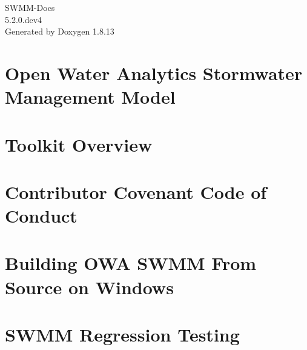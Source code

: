 \documentclass[twoside]{book}
\newcommand{\+}{\discretionary{\mbox{\scriptsize$\hookleftarrow$}}{}{}}
\newcommand{\clearemptydoublepage}{%
  \newpage{\pagestyle{empty}\cleardoublepage}%
}
\begin{document}
\hypersetup{pageanchor=false,
             bookmarksnumbered=true,
             pdfencoding=unicode
            }
\begin{titlepage}
\vspace*{7cm}
\begin{center}%
{\Large S\+W\+M\+M-\/\+Docs \\[1ex]\large 5.\+2.\+0.\+dev4 }\\
\vspace*{1cm}
{\large Generated by Doxygen 1.8.13}\\
\end{center}
\end{titlepage}
\clearemptydoublepage
{}
\tableofcontents
\clearemptydoublepage
{}
\hypersetup{pageanchor=true}

\chapter{Open Water Analytics Stormwater Management Model}
\label{index}\hypertarget{index}{}
\chapter{Toolkit Overview}
\label{toolkit-overview}

\chapter{Contributor Covenant Code of Conduct}
\label{md__c_1__p_r_o_j_e_c_t_c_o_d_e__stormwater-_management-_model__8github__c_o_d_e__o_f__c_o_n_d_u_c_t}

\chapter{Building O\+WA S\+W\+MM From Source on Windows}
\label{md__c_1__p_r_o_j_e_c_t_c_o_d_e__stormwater-_management-_model__8github__c_o_n_t_r_i_b_u_t_i_n_g}

\chapter{S\+W\+MM Regression Testing}
\label{md__c_1__p_r_o_j_e_c_t_c_o_d_e__stormwater-_management-_model__8github__r_e_g_r_e_s_s_i_o_n__t_e_s_t_i_n_g}

\end{document}
